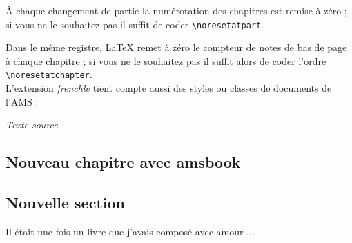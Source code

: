 \documentclass[a4paper,12pt,openright]{article}
\begin{document}
À chaque changement de partie la numérotation des chapitres est remise à
zéro ; si vous ne le souhaitez pas il suffit de coder \verb|\noresetatpart|.

Dans le même registre, \LaTeX{} remet à zéro le compteur de notes de bas de
page à chaque chapitre ; si vous ne le souhaitez pas il suffit alors de coder l’ordre
\verb|\noresetatchapter|.\\

L’extension \textit{frenchle} tient compte aussi des styles ou classes de documents
de l’AMS :

\begin{center} %
\textit{Texte source}\\[1ex]
\begin{boxedverbatim}
\chapter{Nouveau chapitre avec amsbook}

\section{Nouvelle section}

Il était une fois un livre que
j’avais composé avec amour ...
\end{boxedverbatim}


\end{center}
\end{document}
